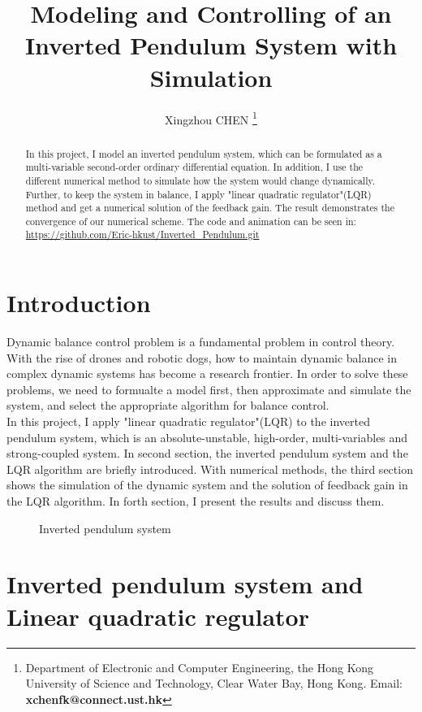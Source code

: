 \documentclass[a4paper,11pt]{article}
\title{Modeling and Controlling of an Inverted Pendulum System with Simulation}
\author{
Xingzhou CHEN \thanks{Department of Electronic and Computer Engineering, the Hong Kong University of Science and Technology, Clear Water Bay, Hong Kong. Email: {\bf xchenfk@connect.ust.hk}}  
}
\begin{document}
\thispagestyle{plain}
\maketitle

\begin{abstract}
In this project, I model an inverted pendulum system, which can be formulated as a multi-variable second-order ordinary differential equation. 
In addition, I use the different numerical method to simulate how the system would change dynamically. Further, to keep the system in balance,
I apply "linear quadratic regulator"(LQR) method and get a numerical solution of the feedback gain. The result demonstrates the convergence of
our numerical scheme. The code and animation can be seen in: \url{https://github.com/Eric-hkust/Inverted_Pendulum.git}

\end{abstract}

\section{Introduction}
Dynamic balance control problem is a fundamental problem in control theory. With the rise of drones and robotic dogs, how to maintain dynamic balance 
in complex dynamic systems has become a research frontier. In order to solve these problems, we need to formualte a model first, then approximate 
and simulate the system, and select the appropriate algorithm for balance control. \\
In this project, I apply "linear quadratic regulator"(LQR) to 
the inverted pendulum system, which is an absolute-unstable, high-order, multi-variables and strong-coupled system. In second section, the inverted pendulum 
system and the LQR algorithm are briefly introduced. With numerical methods, the third section shows the simulation of the dynamic system and the solution of 
feedback gain in the LQR algorithm. In forth section, I present the results and discuss them.
\begin{figure}[!htb]
	\centerline{
	}
	\caption{Inverted pendulum system}
	\label{Figure:Cart with inverted pendulum}
\end{figure}

\section{Inverted pendulum system and Linear quadratic regulator}
\end{document}
